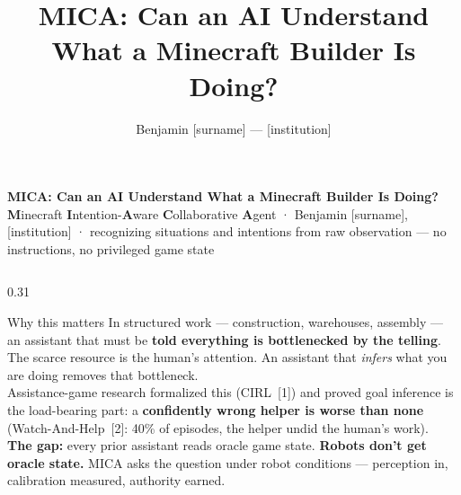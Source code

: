 \documentclass[final]{beamer}
\title{MICA: Can an AI Understand What a Minecraft Builder Is Doing?}
\author{Benjamin [surname] --- [institution]}
\begin{document}
\begin{frame}[t]

\begin{center}
{\fontsize{80}{86}\selectfont\bfseries\color{micablue}
  MICA: Can an AI Understand What a Minecraft Builder Is Doing?}\\[0.4em]
{\Large \textbf{M}inecraft \textbf{I}ntention-\textbf{A}ware \textbf{C}ollaborative
\textbf{A}gent \;\;·\;\; Benjamin [surname], [institution] \;\;·\;\;
recognizing situations and intentions from raw observation --- no instructions,
no privileged game state}
\end{center}
\vspace{0.6em}

\begin{columns}[t]

\begin{column}{0.31\textwidth}

\begin{block}{Why this matters}
In structured work --- construction, warehouses, assembly --- an assistant that
must be \textbf{told everything is bottlenecked by the telling}. The scarce
resource is the human's attention. An assistant that \emph{infers} what you are
doing removes that bottleneck.\\[0.5em]
Assistance-game research formalized this (CIRL~[1]) and proved goal inference
is the load-bearing part: a \textbf{confidently wrong helper is worse than
none} (Watch-And-Help~[2]: 40\% of episodes, the helper undid the human's work).\\[0.5em]
\textbf{The gap:} every prior assistant reads oracle game state.
\textbf{Robots don't get oracle state.} MICA asks the question under robot
conditions --- perception in, calibration measured, authority earned.
\end{block}


\end{column}
\end{columns}
\end{frame}
\end{document}
